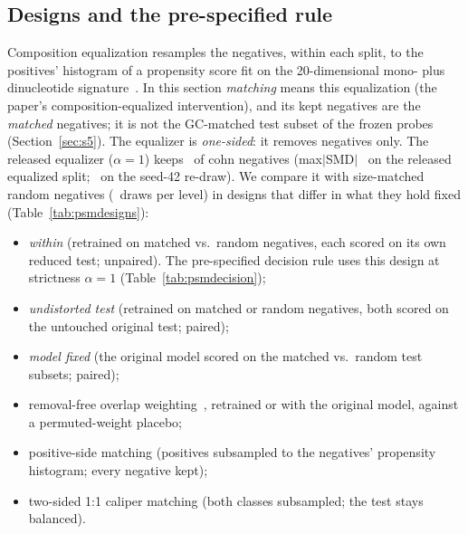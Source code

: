 \documentclass[journal,onecolumn,10pt,letterpaper]{IEEEtran}
\newcommand{\tasku}{\textunderscore\allowbreak}
\DeclareRobustCommand{\task}[1]{{\normalfont\ttfamily\upshape\let\_\tasku #1}}
\begin{document}
\subsection{Designs and the pre-specified rule}
Composition equalization resamples the negatives, within each split, to the positives' histogram of
a propensity score fit on the 20-dimensional mono- plus dinucleotide signature~\cite{rosenbaum1983}.
In this section \emph{matching} means this equalization (the paper's composition-equalized intervention), and
its kept negatives are the \emph{matched} negatives; it is not the GC-matched test subset of the frozen
probes (Section~\ref{sec:s5}). The equalizer is \emph{one-sided}: it removes negatives only.
The released equalizer ($\alpha{=}1$) keeps \smKeptCohn\ of \task{cohn} negatives (max$|$SMD$|$ \smSMDpub\ on
the released equalized split; \smSMDredraw\ on the seed-42 re-draw). We compare it with size-matched random
negatives (\smNrandom\ draws per level) in designs that differ in what they hold fixed
(Table~\ref{tab:psmdesigns}):
\begin{itemize}
\item \emph{within} (retrained on matched vs.\ random negatives, each scored on its own reduced test;
unpaired). The pre-specified decision rule uses this design at strictness $\alpha=1$
(Table~\ref{tab:psmdecision});
\item \emph{undistorted test} (retrained on matched or random negatives, both scored on the untouched
original test; paired);
\item \emph{model fixed} (the original model scored on the matched vs.\ random test subsets; paired);
\item removal-free overlap weighting~\cite{li2018}, retrained or with the original model, against a
permuted-weight placebo;
\item positive-side matching (positives subsampled to the negatives' propensity histogram; every
negative kept);
\item two-sided 1:1 caliper matching (both classes subsampled; the test stays balanced).
\end{itemize}


\end{document}
